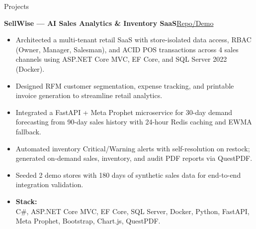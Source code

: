 \documentclass{resume}
\newcommand{\sellwiseRepo}{https://github.com/mr-sohel/SellWise}
\newcommand{\projecttitle}[2]{%
    \textbf{#1}\hfill{\footnotesize\href{#2}{Repo/Demo}}%
}
\begin{document}
\hspace{0.04\textwidth}%
\begin{minipage}[t]{0.46\textwidth}
\vspace{0pt}


\begin{rSection}{Projects}

\projecttitle{SellWise --- AI Sales Analytics \& Inventory SaaS}{\sellwiseRepo}
\vspace{4pt}
\begin{itemize}
    \item Architected a multi-tenant retail SaaS with store-isolated data access, RBAC (Owner, Manager, Salesman), and ACID POS transactions across 4 sales channels using ASP.NET Core MVC, EF Core, and SQL Server 2022 (Docker).

    \item Designed RFM customer segmentation, expense tracking, and printable invoice generation to streamline retail analytics.

    \item Integrated a FastAPI + Meta Prophet microservice for 30-day demand forecasting from 90-day sales history with 24-hour Redis caching and EWMA fallback.

    \item Automated inventory Critical/Warning alerts with self-resolution on restock; generated on-demand sales, inventory, and audit PDF reports via QuestPDF.

    \item Seeded 2 demo stores with 180 days of synthetic sales data for end-to-end integration validation.

    \item {\bf Stack:}\\
    C\#, ASP.NET Core MVC, EF Core, SQL Server, Docker, Python, FastAPI, Meta Prophet, Bootstrap, Chart.js, QuestPDF.
\end{itemize}

\end{rSection}





\end{minipage}
\end{document}
